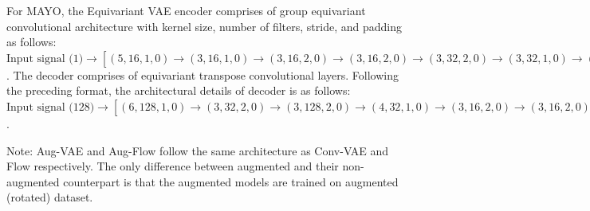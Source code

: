For MAYO, the Equivariant VAE encoder comprises of group equivariant convolutional architecture with kernel size, number of filters, stride, and padding as follows: $\text{Input signal (1)} \rightarrow [(5, 16, 1, 0) \rightarrow (3, 16, 1, 0) \rightarrow (3, 16, 2, 0) \rightarrow (3, 16, 2, 0) \rightarrow (3, 32, 2, 0) \rightarrow (3, 32, 1, 0) \rightarrow (3, 32, 1, 0) \rightarrow (3, 64, 1, 0) \rightarrow (2, 256, 2, 0)  \rightarrow flatten(.) \rightarrow (\mu_z, \log\sigma_z^2)]$. The decoder comprises of equivariant transpose convolutional layers. Following the preceding format, the architectural details of decoder is as follows: $\text{Input signal (128)} \rightarrow [(6, 128, 1, 0) \rightarrow (3, 32, 2, 0) \rightarrow (3, 128, 2, 0) \rightarrow (4, 32, 1, 0) \rightarrow (3, 16, 2, 0) \rightarrow (3, 16, 2, 0) \rightarrow (4, 8, 1, 0) \rightarrow (3, 8, 1, 0) \rightarrow (3, 1, 1, 0) \rightarrow flatten(.) \rightarrow (\mu_x)]$.

Note: Aug-VAE and Aug-Flow follow the same architecture as Conv-VAE and Flow respectively. The only difference between augmented and their non-augmented counterpart is that the augmented models are trained on augmented (rotated) dataset.


